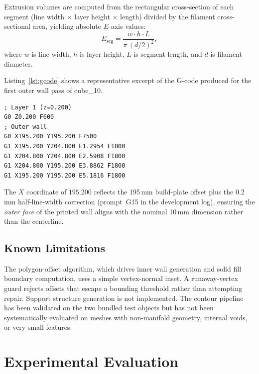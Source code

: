 \documentclass[10pt,twocolumn,a4paper]{article}
\begin{document}
Extrusion volumes are computed from the rectangular cross-section
of each segment (line width $\times$ layer height $\times$ length)
divided by the filament cross-sectional area, yielding absolute
$E$-axis values:
\begin{equation}
  E_{\mathrm{seg}} = \frac{w \cdot h \cdot L}{\pi\,(d/2)^2},
\end{equation}
where $w$ is line width, $h$ is layer height, $L$ is segment
length, and $d$ is filament diameter.

Listing~\ref{lst:gcode} shows a representative excerpt of the
G-code produced for the first outer wall pass of cube\_10.

\begin{lstlisting}[caption={G-code excerpt: outer wall layer 1,
                   cube\_10. Coordinates offset by 195\,mm to
                   printer build-plate centre.},
                   label={lst:gcode}, language={}]
; Layer 1 (z=0.200)
G0 Z0.200 F600
; Outer wall
G0 X195.200 Y195.200 F7500
G1 X195.200 Y204.800 E1.2954 F1800
G1 X204.800 Y204.800 E2.5908 F1800
G1 X204.800 Y195.200 E3.8862 F1800
G1 X195.200 Y195.200 E5.1816 F1800
\end{lstlisting}

The $X$ coordinate of $195.200$ reflects the 195\,mm build-plate
offset plus the 0.2\,mm half-line-width correction
(prompt~G15 in the development log), ensuring the \emph{outer face}
of the printed wall aligns with the nominal 10\,mm dimension
rather than the centerline.

\subsection{Known Limitations}

The polygon-offset algorithm, which drives inner wall generation
and solid fill boundary computation, uses a simple vertex-normal
inset. A runaway-vertex guard rejects offsets that escape a
bounding threshold rather than attempting repair.
Support structure generation is not implemented.
The contour pipeline has been validated on the two bundled test
objects but has not been systematically evaluated on meshes with
non-manifold geometry, internal voids, or very small features.

\section{Experimental Evaluation}
\label{sec:eval}
\end{document}
